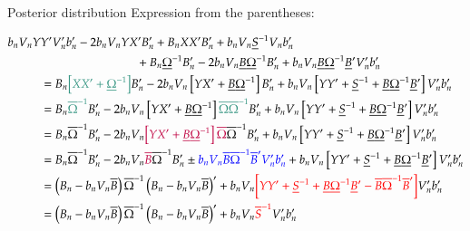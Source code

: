 \documentclass[notes,blackandwhite,mathsans,usenames,dvipsnames]{beamer}
\begin{document}
\begin{frame}{Posterior distribution}
\small
Expression from the parentheses:\scriptsize
\begin{adjustwidth}{-0.7cm}{0cm}
\begin{align*}
b_nV_nY&Y'V_n'b_n' -2 b_nV_nYX'B_n' + B_nXX'B_n' 
+ b_nV_n\underline{S}^{-1}V_nb_n'\\
 &\qquad\qquad\qquad\qquad+ B_n \underline{\Omega}^{-1} B_n' -2b_nV_n\underline{B}\underline{\Omega}^{-1}B_n' + b_nV_n\underline{B}\underline{\Omega}^{-1}\underline{B}'V_n'b_n' \\
&= B_n{\color{mcxs2}\left[XX'  + \underline{\Omega}^{-1} \right]} B_n'
-2 b_nV_n\left[YX' +\underline{B}\underline{\Omega}^{-1}\right]B_n'
+ b_nV_n\left[ YY' + \underline{S}^{-1} + \underline{B}\underline{\Omega}^{-1}\underline{B}'\right]V_n'b_n'\\
&= B_n{\color{mcxs2}\overline{\Omega}^{-1}} B_n'
-2 b_nV_n\left[YX' +\underline{B}\underline{\Omega}^{-1}\right]{\color{mcxs2}\overline{\Omega}}{\color{mcxs2}\overline{\Omega}^{-1}}B_n'
+ b_nV_n\left[ YY' + \underline{S}^{-1} + \underline{B}\underline{\Omega}^{-1}\underline{B}'\right]V_n'b_n'\\
&= B_n\overline{\Omega}^{-1} B_n'
-2 b_nV_n{\color{purple}\left[YX' +\underline{B}\underline{\Omega}^{-1}\right]\overline{\Omega}}\overline{\Omega}^{-1}B_n'
+ b_nV_n\left[ YY' + \underline{S}^{-1} + \underline{B}\underline{\Omega}^{-1}\underline{B}'\right]V_n'b_n'\\
&= B_n\overline{\Omega}^{-1} B_n'
-2 b_nV_n{\color{purple}\overline{B}}\overline{\Omega}^{-1}B_n' \pm{\color{blue}b_nV_n\overline{B}\overline{\Omega}^{-1}\overline{B}'V_n'b_n'}
+ b_nV_n\left[ YY' + \underline{S}^{-1} + \underline{B}\underline{\Omega}^{-1}\underline{B}'\right]V_n'b_n'\\
&= \left( B_n - b_nV_n\overline{B} \right)\overline{\Omega}^{-1}\left( B_n - b_nV_n\overline{B} \right)'
+ b_nV_n{\color{red}\left[ YY' + \underline{S}^{-1} + \underline{B}\underline{\Omega}^{-1}\underline{B}' - \overline{B}\overline{\Omega}^{-1}\overline{B}' \right]}V_n'b_n'\\
&= \left( B_n - b_nV_n\overline{B} \right)\overline{\Omega}^{-1}\left( B_n - b_nV_n\overline{B} \right)'
+ b_nV_n{\color{red}\overline{S}^{-1}}V_n'b_n'\\
\end{align*}
\end{adjustwidth}

\end{frame}
\end{document}
